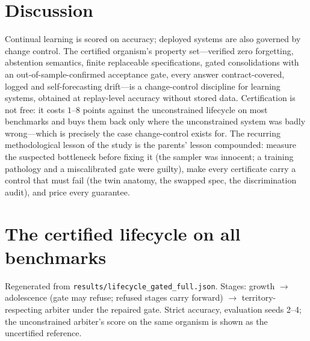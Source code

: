 \documentclass{article}
\begin{document}
\section{Discussion}
Continual learning is scored on accuracy; deployed systems are also governed
by change control. The certified organism's property set---verified zero
forgetting, abstention semantics, finite replaceable specifications, gated
consolidations with an out-of-sample-confirmed acceptance gate, every answer
contract-covered, logged and self-forecasting drift---is a change-control
discipline for learning systems, obtained at replay-level accuracy without
stored data. Certification is not free: it costs $1$--$8$ points against the
unconstrained lifecycle on most benchmarks and buys them back only where the
unconstrained system was badly wrong---which is precisely the case
change-control exists for. The recurring methodological lesson of the study
is the parents' lesson compounded: measure the suspected bottleneck before
fixing it (the sampler was innocent; a training pathology and a miscalibrated
gate were guilty), make every certificate carry a control that must fail
(the twin anatomy, the swapped spec, the discrimination audit), and price
every guarantee.




\clearpage
\appendix

\section{The certified lifecycle on all benchmarks}\label{app:lifecycle}
Regenerated from \texttt{results/lifecycle\_gated\_full.json}. Stages: growth
$\to$ adolescence (gate may refuse; refused stages carry forward) $\to$
territory-respecting arbiter under the repaired gate. Strict accuracy,
evaluation seeds 2--4; the unconstrained arbiter's score on the same organism
is shown as the uncertified reference.
\end{document}
